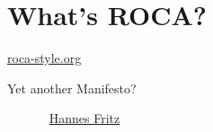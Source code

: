 \documentclass{beamer}
\begin{document}
\section{What's ROCA?}

{
  \begin{frame}
    \vspace*{-2.5in}
    \href{http://roca-style.org}{roca-style.org}
  \end{frame}
}

\begin{frame}
  \Huge Yet another Manifesto?
\end{frame}

{
  \begin{frame}
    \vfill
    \vfill
    \vfill
    \vfill
    \vfill
    \vfill
    \vfill
    \vfill
    \vfill
    \vfill
    \textcolor{white}{
      \small source: \href{http://www.flickr.com/photos/sensorsicht/5338348801/}{Hannes Fritz}
    }
  \end{frame}
}
\end{document}
